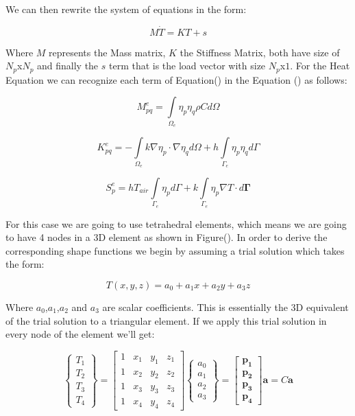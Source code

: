 \documentclass[12pt]{article}
\begin{document}
We can then rewrite the system of equations in the form:

\begin{equation}
 M\dot{T} = KT + s
\end{equation}

Where $M$ represents the Mass matrix, $K$ the Stiffness Matrix, both have size of $N_p$x$N_p$ and finally the $s$ term that is the load vector with size $N_p$x$1$. For the Heat Equation we can recognize each term of Equation() in the Equation () as follows:

\begin{equation}
 M_{pq}^e = \int\limits_{\Omega_e} \eta_p\eta_q \rho C d\Omega
\end{equation}

\begin{equation}
 K_{pq}^e = -\int\limits_{\Omega_e} k \nabla \eta_p \cdot \nabla \eta_q d\Omega + h \int\limits_{\Gamma_e} \eta_p \eta_q d\Gamma
\end{equation}

\begin{equation}
 S_{p}^e = h T_{air} \int\limits_{\Gamma_e} \eta_p d\Gamma + k \int\limits_{\Gamma_{e}}{\eta_p\nabla T} \cdot d \mathbf{\Gamma}
\end{equation}

For this case we are going to use tetrahedral elements, which means we are going to have 4 nodes in a 3D element as shown in Figure(). In order to derive the corresponding shape functions we begin by assuming a trial solution which takes the form:

\begin{equation}
T(x,y,z) = a_0+a_1x+a_2y+a_3z
\end{equation}

Where $a_0$,$a_1$,$a_2$ and $a_3$ are scalar coefficients. This is essentially the 3D equivalent of the trial solution to a triangular element. If we apply this trial solution in every node of the element we'll get:

\begin{equation}
\begin{Bmatrix} T_1 \\ T_2 \\ T_3 \\ T_4 \end{Bmatrix} = 
\begin{bmatrix} 1 & x_1 & y_1 & z_1 \\ 1 & x_2 & y_2 & z_2 \\ 1 & x_3 & y_3 & z_3 \\ 1 & x_4 & y_4 & z_4\end{bmatrix}
\begin{Bmatrix} a_0 \\ a_1 \\ a_2 \\ a_3 \end{Bmatrix} =
\begin{bmatrix} \mathbf{p_1} \\ \mathbf{p_2} \\ \mathbf{p_3} \\ \mathbf{p_4} \end{bmatrix}\mathbf{a} = C\mathbf{a}
\end{equation}
\end{document}
